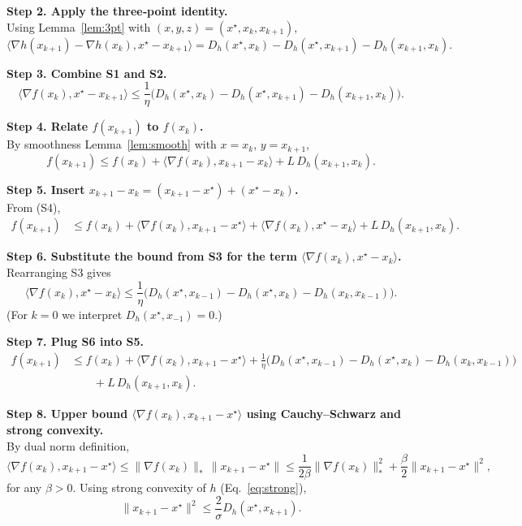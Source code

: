 \documentclass{article}
\begin{document}
\noindent\textbf{Step 2. Apply the three‑point identity.}\\
Using Lemma~\ref{lem:3pt} with $(x,y,z)=(x^{\star},x_k,x_{k+1})$,
\[
\langle\nabla h(x_{k+1})-\nabla h(x_k),x^{\star}-x_{k+1}\rangle
= D_h(x^{\star},x_k)-D_h(x^{\star},x_{k+1})-D_h(x_{k+1},x_k).
\tag{S2}
\]

\noindent\textbf{Step 3. Combine S1 and S2.}
\[
\langle\nabla f(x_k),x^{\star}-x_{k+1}\rangle
\le\frac{1}{\eta}\Big(D_h(x^{\star},x_k)-D_h(x^{\star},x_{k+1})-D_h(x_{k+1},x_k)\Big).
\tag{S3}
\]

\noindent\textbf{Step 4. Relate $f(x_{k+1})$ to $f(x_k)$.}\\
By smoothness Lemma~\ref{lem:smooth} with $x=x_k$, $y=x_{k+1}$,
\[
f(x_{k+1})\le f(x_k)+\langle\nabla f(x_k),x_{k+1}-x_k\rangle+L\,D_h(x_{k+1},x_k).
\tag{S4}
\]

\noindent\textbf{Step 5. Insert $x_{k+1}-x_k = (x_{k+1}-x^{\star})+(x^{\star}-x_k)$.}\\
From (S4),
\[
\begin{aligned}
f(x_{k+1})
&\le f(x_k)+\langle\nabla f(x_k),x_{k+1}-x^{\star}\rangle
      +\langle\nabla f(x_k),x^{\star}-x_k\rangle
      +L\,D_h(x_{k+1},x_k).
\end{aligned}
\tag{S5}
\]

\noindent\textbf{Step 6. Substitute the bound from S3 for the term $\langle\nabla f(x_k),x^{\star}-x_k\rangle$.}\\
Rearranging S3 gives
\[
\langle\nabla f(x_k),x^{\star}-x_k\rangle
\le\frac{1}{\eta}\Big(D_h(x^{\star},x_{k-1})-D_h(x^{\star},x_k)-D_h(x_k,x_{k-1})\Big).
\tag{S6}
\]
(For $k=0$ we interpret $D_h(x^{\star},x_{-1})=0$.)

\noindent\textbf{Step 7. Plug S6 into S5.}
\[
\begin{aligned}
f(x_{k+1})
&\le f(x_k)+\langle\nabla f(x_k),x_{k+1}-x^{\star}\rangle
   +\frac{1}{\eta}\Big(D_h(x^{\star},x_{k-1})-D_h(x^{\star},x_k)-D_h(x_k,x_{k-1})\Big)\\
&\qquad +L\,D_h(x_{k+1},x_k).
\end{aligned}
\tag{S7}
\]

\noindent\textbf{Step 8. Upper bound $\langle\nabla f(x_k),x_{k+1}-x^{\star}\rangle$ using Cauchy–Schwarz and strong convexity.}\\
By dual norm definition,
\[
\langle\nabla f(x_k),x_{k+1}-x^{\star}\rangle
\le\|\nabla f(x_k)\|_{*}\,\|x_{k+1}-x^{\star}\|
\le\frac{1}{2\beta}\|\nabla f(x_k)\|_{*}^{2}+\frac{\beta}{2}\|x_{k+1}-x^{\star}\|^{2},
\tag{S8}
\]
for any $\beta>0$. Using strong convexity of $h$ (Eq.~\eqref{eq:strong}),
\[
\|x_{k+1}-x^{\star}\|^{2}\le\frac{2}{\sigma}D_h(x^{\star},x_{k+1}).
\tag{S9}
\]
\end{document}
